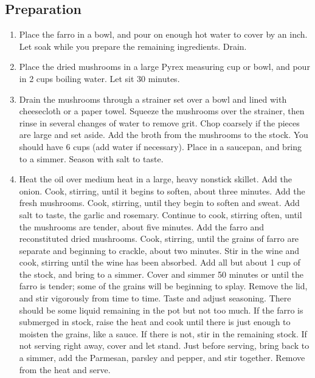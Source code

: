 \subsection{Preparation}
\begin{enumerate}
    \item Place the farro in a bowl, and pour on enough hot water to cover by an inch. Let soak while you prepare the remaining ingredients. Drain.
    \item Place the dried mushrooms in a large Pyrex measuring cup or bowl, and pour in 2 cups boiling water. Let sit 30 minutes.
    \item Drain the mushrooms through a strainer set over a bowl and lined with cheesecloth or a paper towel. Squeeze the mushrooms over the strainer, then rinse in several changes of water to remove grit. Chop coarsely if the pieces are large and set aside. Add the broth from the mushrooms to the stock. You should have 6 cups (add water if necessary). Place in a saucepan, and bring to a simmer. Season with salt to taste.
    \item Heat the oil over medium heat in a large, heavy nonstick skillet. Add the onion. Cook, stirring, until it begins to soften, about three minutes. Add the fresh mushrooms. Cook, stirring, until they begin to soften and sweat. Add salt to taste, the garlic and rosemary. Continue to cook, stirring often, until the mushrooms are tender, about five minutes. Add the farro and reconstituted dried mushrooms. Cook, stirring, until the grains of farro are separate and beginning to crackle, about two minutes. Stir in the wine and cook, stirring until the wine has been absorbed. Add all but about 1 cup of the stock, and bring to a simmer. Cover and simmer 50 minutes or until the farro is tender; some of the grains will be beginning to splay. Remove the lid, and stir vigorously from time to time. Taste and adjust seasoning. There should be some liquid remaining in the pot but not too much. If the farro is submerged in stock, raise the heat and cook until there is just enough to moisten the grains, like a sauce. If there is not, stir in the remaining stock. If not serving right away, cover and let stand. Just before serving, bring back to a simmer, add the Parmesan, parsley and pepper, and stir together. Remove from the heat and serve.
\end{enumerate}
